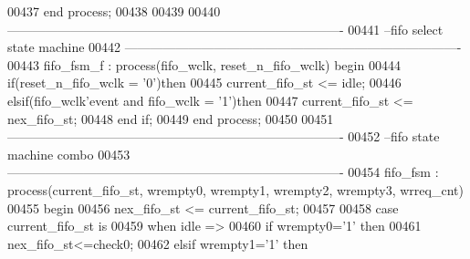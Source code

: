 \begin{DoxyCode}
00437 \textcolor{keywordflow}{end} \textcolor{keywordflow}{process};
00438 
00439 
00440 \textcolor{keyword}{-------------------------------------------------------------------------------}
00441 \textcolor{keyword}{--fifo select state machine}
00442 \textcolor{keyword}{-------------------------------------------------------------------------------}
00443 fifo\_fsm\_f : \textcolor{keywordflow}{process}(fifo_wclk, reset_n_fifo_wclk) \textcolor{keywordflow}{begin}
00444     \textcolor{keywordflow}{if}\textcolor{vhdlchar}{(}\textcolor{vhdlchar}{reset_n_fifo_wclk} \textcolor{vhdlchar}{=} \textcolor{vhdlchar}{'}\textcolor{vhdllogic}{}\textcolor{vhdllogic}{0}\textcolor{vhdlchar}{'}\textcolor{vhdlchar}{)}\textcolor{keywordflow}{then}
00445         \textcolor{vhdlchar}{current_fifo_st} \textcolor{vhdlchar}{<=} \textcolor{vhdlchar}{idle};
00446     \textcolor{keywordflow}{elsif}\textcolor{vhdlchar}{(}\textcolor{vhdlchar}{fifo_wclk}\textcolor{vhdlchar}{'}\textcolor{vhdlkeyword}{event} \textcolor{keywordflow}{and} \textcolor{vhdlchar}{fifo_wclk} \textcolor{vhdlchar}{=} \textcolor{vhdlchar}{'}\textcolor{vhdllogic}{}\textcolor{vhdllogic}{1}\textcolor{vhdlchar}{'}\textcolor{vhdlchar}{)}\textcolor{keywordflow}{then} 
00447         \textcolor{vhdlchar}{current_fifo_st} \textcolor{vhdlchar}{<=} \textcolor{vhdlchar}{nex_fifo_st};
00448     \textcolor{keywordflow}{end} \textcolor{keywordflow}{if}; 
00449 \textcolor{keywordflow}{end} \textcolor{keywordflow}{process};
00450 
00451 \textcolor{keyword}{-------------------------------------------------------------------------------}
00452 \textcolor{keyword}{--fifo state machine combo}
00453 \textcolor{keyword}{-------------------------------------------------------------------------------}
00454 fifo\_fsm : \textcolor{keywordflow}{process}(current_fifo_st, wrempty0, wrempty1, wrempty2, wrempty3, 
      wrreq_cnt) 
00455 \textcolor{vhdlkeyword}{begin}
00456     \textcolor{vhdlchar}{nex_fifo_st} \textcolor{vhdlchar}{<=} \textcolor{vhdlchar}{current_fifo_st};
00457     
00458     \textcolor{keywordflow}{case} \textcolor{vhdlchar}{current_fifo_st} \textcolor{keywordflow}{is}
00459       \textcolor{keywordflow}{when} \textcolor{vhdlchar}{idle} \textcolor{vhdlchar}{=}\textcolor{vhdlchar}{>}
00460             \textcolor{keywordflow}{if} \textcolor{vhdlchar}{wrempty0}\textcolor{vhdlchar}{=}\textcolor{vhdlchar}{'}\textcolor{vhdllogic}{}\textcolor{vhdllogic}{1}\textcolor{vhdlchar}{'} \textcolor{keywordflow}{then} 
00461               \textcolor{vhdlchar}{nex_fifo_st}\textcolor{vhdlchar}{<=}\textcolor{vhdlchar}{check0};
00462             \textcolor{keywordflow}{elsif} \textcolor{vhdlchar}{wrempty1}\textcolor{vhdlchar}{=}\textcolor{vhdlchar}{'}\textcolor{vhdllogic}{}\textcolor{vhdllogic}{1}\textcolor{vhdlchar}{'} \textcolor{keywordflow}{then} 

\end{DoxyCode}
